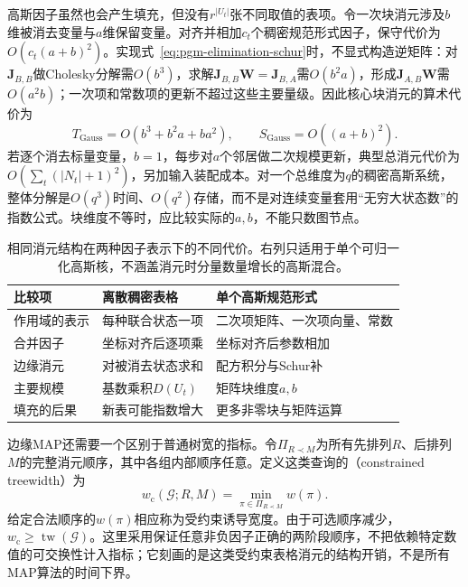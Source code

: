 高斯因子虽然也会产生填充，但没有$r^{|U_t|}$张不同取值的表项。令一次块消元涉及$b$维被消去变量与$a$维保留变量。对齐并相加$c_t$个稠密规范形式因子，保守代价为$O(c_t(a+b)^2)$。实现式~\eqref{eq:pgm-elimination-schur}时，不显式构造逆矩阵：对$\bm{J}_{B,B}$做Cholesky分解需$O(b^3)$，求解$\bm{J}_{B,B}\bm{W}=\bm{J}_{B,A}$需$O(b^2a)$，形成$\bm{J}_{A,B}\bm{W}$需$O(a^2b)$；一次项和常数项的更新不超过这些主要量级。因此核心块消元的算术代价为
\begin{equation}
  T_{\mathrm{Gauss}}
  =O(b^3+b^2a+ba^2),\qquad
  S_{\mathrm{Gauss}}=O((a+b)^2).
  \label{eq:pgm-elimination-gaussian-cost}
\end{equation}
若逐个消去标量变量，$b=1$，每步对$a$个邻居做二次规模更新，典型总消元代价为$O(\sum_t(|N_t|+1)^2)$，另加输入装配成本。对一个总维度为$q$的稠密高斯系统，整体分解是$O(q^3)$时间、$O(q^2)$存储，而不是对连续变量套用“无穷大状态数”的指数公式。块维度不等时，应比较实际的$a,b$，不能只数图节点。

\begin{table}[htbp]
  \centering
  \begin{tabularx}{\linewidth}{@{}lXX@{}}
    \toprule
    比较项 & 离散稠密表格 & 单个高斯规范形式\\
    \midrule
    作用域的表示 & 每种联合状态一项 & 二次项矩阵、一次项向量、常数\\
    合并因子 & 坐标对齐后逐项乘 & 坐标对齐后参数相加\\
    边缘消元 & 对被消去状态求和 & 配方积分与Schur补\\
    主要规模 & 基数乘积$D(U_t)$ & 矩阵块维度$a,b$\\
    填充的后果 & 新表可能指数增大 & 更多非零块与矩阵运算\\
    \bottomrule
  \end{tabularx}
  \caption{相同消元结构在两种因子表示下的不同代价。右列只适用于单个可归一化高斯核，不涵盖消元时分量数量增长的高斯混合。}
  \label{tab:pgm-elimination-representation-cost}
\end{table}

边缘MAP还需要一个区别于普通树宽的指标。令$\Pi_{R\prec M}$为所有先排列$R$、后排列$M$的完整消元顺序，其中各组内部顺序任意。定义这类查询的（constrained treewidth）为
\begin{equation}
  w_{\mathrm{c}}(\mathcal{G};R,M)
  =\min_{\pi\in\Pi_{R\prec M}}w(\pi).
  \label{eq:pgm-elimination-constrained-width}
\end{equation}
给定合法顺序的$w(\pi)$相应称为受约束诱导宽度。由于可选顺序减少，$w_{\mathrm{c}}\geq\operatorname{tw}(\mathcal{G})$。这里采用保证任意非负因子正确的两阶段顺序，不把依赖特定数值的可交换性计入指标；它刻画的是这类受约束表格消元的结构开销，不是所有MAP算法的时间下界。

